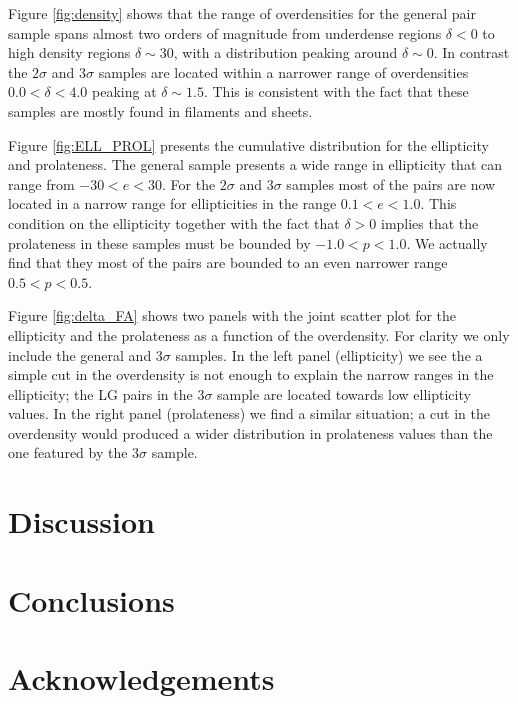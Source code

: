 \documentclass{emulateapj}
\begin{document}
Figure \ref{fig:density} shows that the range of overdensities for the
general pair sample spans almost two orders of magnitude from
underdense regions $\delta<0$ to high density regions $\delta\sim 30$,
with a distribution peaking around $\delta \sim 0$. In contrast the
$2\sigma$ and $3\sigma$ samples are located within a narrower range of
overdensities $0.0<\delta<4.0$ peaking at $\delta \sim 1.5$. This is
consistent with the fact that these samples are mostly found in
filaments and sheets.   

Figure \ref{fig:ELL_PROL} presents the cumulative distribution for
the ellipticity and prolateness. The general sample presents a wide
range in ellipticity that can range from $-30<e<30$. For the $2\sigma$
and $3\sigma$ samples most of the pairs are now located in a narrow
range for ellipticities in the range $0.1<e<1.0$. This condition on
the ellipticity together with the fact that $\delta>0$ implies that
the prolateness in these samples must be bounded by
$-1.0<p<1.0$. We actually find that they most of the pairs are bounded
to an even narrower range $0.5<p<0.5$. 

Figure \ref{fig:delta_FA} shows two panels with the joint scatter plot
for the ellipticity and the prolateness as a function of the
overdensity. For clarity we only include the general and $3\sigma$
samples. In the left panel (ellipticity) we see the a simple cut in
the overdensity is not enough to explain the narrow ranges in the
ellipticity; the LG pairs in the $3\sigma$ sample are located towards
low ellipticity values. In the right panel (prolateness) we find a
similar situation; a cut in the overdensity would produced a wider
distribution in prolateness values than the one featured by the
$3\sigma$ sample.



\section{Discussion}
\label{sec:discussion}

\section{Conclusions}
\label{sec:conclusions}


\section*{Acknowledgements}


 
\end{document}
